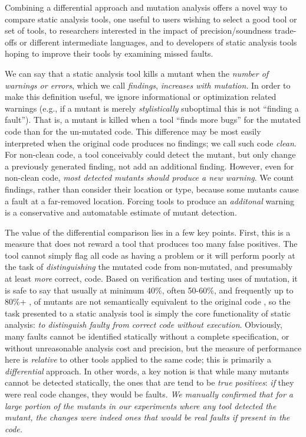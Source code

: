Combining a differential approach and mutation analysis offers a novel way to compare static analysis tools, one useful to users wishing to select a good tool or set of tools, to researchers interested in the impact of precision/soundness trade-offs or different intermediate languages, and to developers of static analysis tools hoping to improve their tools by examining missed faults.


We can say that a static analysis tool kills a mutant when the \emph{number of warnings or errors}, which we call \emph{findings}, \emph{increases with mutation}.  In order to make this definition useful, we ignore informational or optimization related warnings (e.g., if a mutant is merely \emph{stylistically} suboptimal this is not ``finding a fault''). That is, a mutant is killed when a tool ``finds more bugs'' for the mutated code than for the un-mutated code.  This difference may be most easily interpreted when the original code produces no findings; we call such code \emph{clean}. For non-clean code, a tool conceivably could detect the mutant, but only change a previously generated finding, not add an additional finding.  However, even for non-clean code, \emph{most detected mutants should produce a new warning}.  We count findings, rather than consider their location or type, because some mutants cause a fault at a far-removed location.  Forcing tools to produce an \emph{additonal} warning is a conservative and automatable estimate of mutant detection.

The value of the differential comparison lies in a few key points.  First, this is a measure that does not reward a tool that produces too many false positives.  The tool cannot simply flag all code as having a problem or it will perform poorly at the task of \emph{distinguishing} the mutated code from non-mutated, and presumably at least \emph{more} correct, code.  Based on verification and testing uses of mutation, it is safe to say that usually at minimum 40\%, often 50-60\%, and frequently up to 80\%+ \cite{mutKernel,groce2018verified,le2014mucheck}, of mutants are not semantically equivalent to the original code \cite{TCE,impactEquiv,smith2009should}, so the task presented to a static analysis tool is simply the core functionality of static analysis: \emph{to distinguish faulty from correct code without execution}.  Obviously, many faults cannot be identified statically without a complete specification, or without unreasonable analysis cost and precision, but the measure of performance here is \emph{relative} to other tools applied to the same code; this is primarily a \emph{differential} approach.  In other words, a key notion is that while many mutants cannot be detected statically, the ones that are tend to be \emph{true positives}: \emph{if} they were real code changes, they would be faults.  \emph{We manually confirmed that for a large portion of the mutants in our experiments where any tool detected the mutant, the changes were indeed ones that would be real faults if present in the code.}

